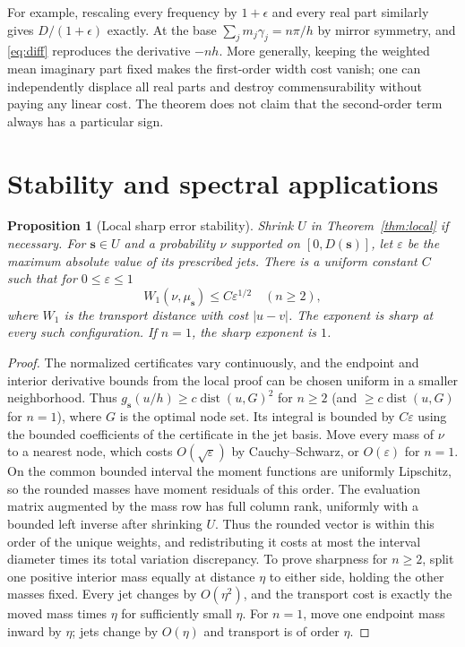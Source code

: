 \documentclass[11pt]{article}
\newtheorem{proposition}[theorem]{Proposition}
\theoremstyle{remark}\newtheorem{remark}[theorem]{Remark}
\begin{document}
For example, rescaling every frequency by $1+\epsilon$ and every real part similarly gives $D/(1+\epsilon)$ exactly. At the base $\sum_jm_j\gamma_j=n\pi/h$ by mirror symmetry, and \eqref{eq:diff} reproduces the derivative $-nh$. More generally, keeping the weighted mean imaginary part fixed makes the first-order width cost vanish; one can independently displace all real parts and destroy commensurability without paying any linear cost. The theorem does not claim that the second-order term always has a particular sign.

\section{Stability and spectral applications}
\begin{proposition}[Local sharp error stability]\label{prop:stability}
Shrink $U$ in Theorem~\ref{thm:local} if necessary. For $\boldsymbol{s}\in U$ and a probability $\nu$ supported on $[0,D(\boldsymbol{s})]$, let $\varepsilon$ be the maximum absolute value of its prescribed jets. There is a uniform constant $C$ such that for $0\le\varepsilon\le1$
\[
 W_1(\nu,\mu_{\boldsymbol{s}})\le C\varepsilon^{1/2}\quad(n\ge2),
\]
where $W_1$ is the transport distance with cost $|u-v|$. The exponent is sharp at every such configuration. If $n=1$, the sharp exponent is $1$.
\end{proposition}
\begin{proof}
The normalized certificates vary continuously, and the endpoint and interior derivative bounds from the local proof can be chosen uniform in a smaller neighborhood. Thus $g_{\boldsymbol{s}}(u/h)\ge c\operatorname{dist}(u,G)^2$ for $n\ge2$ (and $\ge c\operatorname{dist}(u,G)$ for $n=1$), where $G$ is the optimal node set. Its integral is bounded by $C\varepsilon$ using the bounded coefficients of the certificate in the jet basis. Move every mass of $\nu$ to a nearest node, which costs $O(\sqrt\varepsilon)$ by Cauchy--Schwarz, or $O(\varepsilon)$ for $n=1$. On the common bounded interval the moment functions are uniformly Lipschitz, so the rounded masses have moment residuals of this order. The evaluation matrix augmented by the mass row has full column rank, uniformly with a bounded left inverse after shrinking $U$. Thus the rounded vector is within this order of the unique weights, and redistributing it costs at most the interval diameter times its total variation discrepancy. To prove sharpness for $n\ge2$, split one positive interior mass equally at distance $\eta$ to either side, holding the other masses fixed. Every jet changes by $O(\eta^2)$, and the transport cost is exactly the moved mass times $\eta$ for sufficiently small $\eta$. For $n=1$, move one endpoint mass inward by $\eta$; jets change by $O(\eta)$ and transport is of order $\eta$.
\end{proof}
\end{document}
